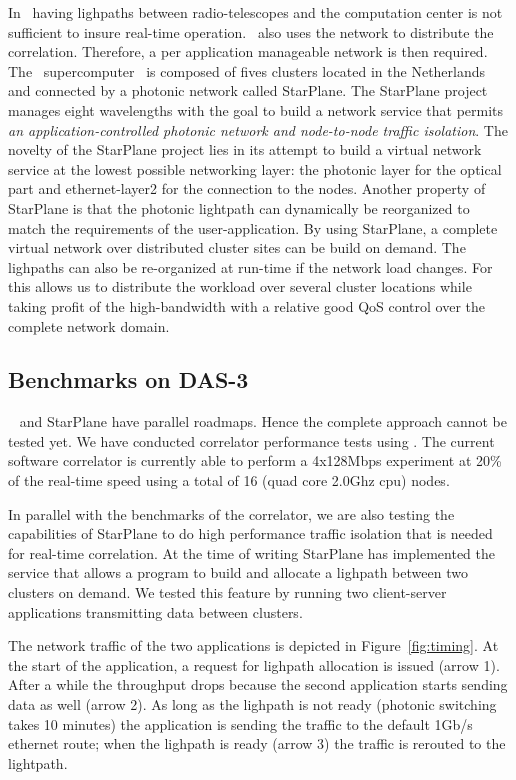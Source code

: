 In \scarie\ having lighpaths between radio-telescopes and the
computation center is not sufficient to insure real-time
operation. \scarie\ also uses the network to distribute the
correlation. Therefore, a per application manageable network is then
required. The \ supercomputer~\cite{das3} is composed of fives
clusters located in the Netherlands and connected by a photonic
network called StarPlane. The StarPlane project manages eight
wavelengths with the goal to build a network service that permits
\textit{an application-controlled photonic network and node-to-node
  traffic isolation}. The novelty of the StarPlane project lies in its
attempt to build a virtual network service at the lowest possible
networking layer: the photonic layer for the optical part and
ethernet-layer2 for the connection to the nodes. Another
property of StarPlane is that the photonic lightpath can dynamically
be reorganized to match the requirements of the user-application. By
using StarPlane, a complete virtual network over distributed cluster
sites can be build on demand. The lighpaths can also be re-organized
at run-time if the network load changes. For \scarie this allows us to
distribute the workload over several cluster locations while taking
profit of the high-bandwidth with a relative good QoS control over the
complete network domain.

\subsection{Benchmarks on DAS-3}
\scarie~ and StarPlane have parallel roadmaps. Hence the complete
approach cannot be tested yet. We have conducted correlator
performance tests using . The current software correlator is
currently able to perform a 4x128Mbps
experiment at 20\% of the real-time speed using a total of 16 (quad
core 2.0Ghz cpu) nodes.

In parallel with the benchmarks of the correlator, we are also testing
the capabilities of StarPlane to do high performance traffic isolation
that is needed for real-time correlation. At the time of writing
StarPlane has implemented the service that allows a program to build
and allocate a lighpath between two clusters on demand. We tested this
feature by running two client-server applications transmitting data
between clusters.

The network traffic of the two applications is depicted in
Figure~\ref{fig:timing}.  At the start of the application, a request
for lighpath allocation is issued (arrow 1). After a while the
throughput drops because the second application starts sending data as
well (arrow 2).  As long as the lighpath is not ready (photonic
switching takes 10 minutes) the application is sending the traffic to
the default 1Gb/s ethernet route; when the lighpath is ready (arrow 3)
the traffic is rerouted to the lightpath.

